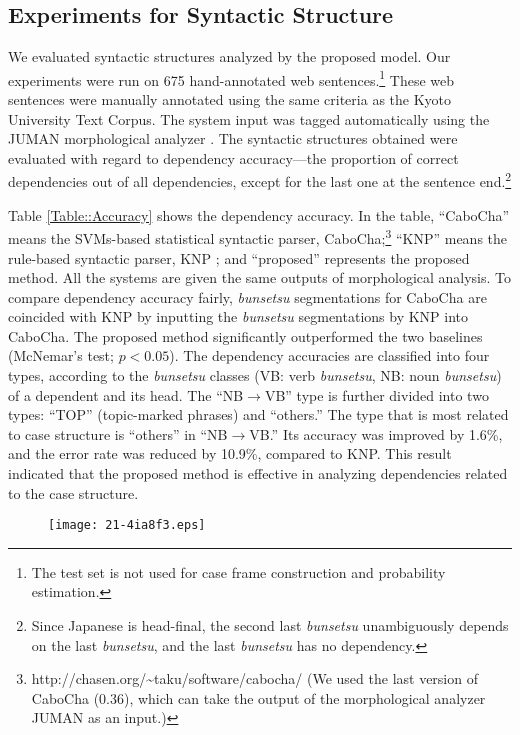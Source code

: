 \documentclass[english]{jnlp_1.4_rep}
\begin{document}
\subsection{Experiments for Syntactic Structure}

We evaluated syntactic structures analyzed by the proposed model. Our
experiments were run on 675 hand-annotated web sentences.\footnote{The
test set is not used for case frame construction and probability
estimation.} These web sentences were manually annotated using the same
criteria as the Kyoto University Text Corpus. The system input was tagged
automatically using the JUMAN morphological analyzer
\cite{Kurohashi1994b}. The syntactic structures obtained were evaluated
with regard to dependency accuracy---the proportion of correct
dependencies out of all dependencies, except for the last one at
the sentence end.\footnote{Since Japanese is head-final, the second last
\textit{bunsetsu} unambiguously depends on the last \textit{bunsetsu},
and the last \textit{bunsetsu} has no dependency.}

Table \ref{Table::Accuracy} shows the dependency accuracy. In the table,
``CaboCha'' means the SVMs-based statistical syntactic parser, CaboCha;\footnote{http://chasen.org/{\textasciitilde}taku/software/cabocha/ 
(We used the last version of CaboCha (0.36), which can take the output
of the morphological analyzer JUMAN as an input.)}
``KNP'' means the rule-based syntactic parser, KNP
\cite{Kurohashi1994}; and ``proposed'' represents the proposed
method. All the systems are given the same outputs of morphological analysis.
To compare dependency accuracy fairly, \textit{bunsetsu}
segmentations for CaboCha are coincided with KNP by inputting the \textit{bunsetsu}
segmentations by KNP into CaboCha.
The proposed method significantly outperformed the two baselines
(McNemar's test; $p < 0.05$). The dependency accuracies are classified
into four types, according to the \textit{bunsetsu} classes (VB: verb
\textit{bunsetsu}, NB: noun \textit{bunsetsu}) of a dependent and its
head. The ``NB$\rightarrow$VB'' type is further divided into two types:
``TOP'' (topic-marked phrases) and ``others.'' The type that is most related to case structure
is ``others'' in ``NB$\rightarrow$VB.'' Its accuracy was improved by
1.6\%, and the error rate was reduced by 10.9\%, compared to KNP. This result indicated
that the proposed method is effective in analyzing dependencies related
to the case structure.

\begin{figure}[b]
  \texttt{[image: 21-4ia8f3.eps]}
 \label{Figure::AnalysisExamples}
\end{figure}
\end{document}
